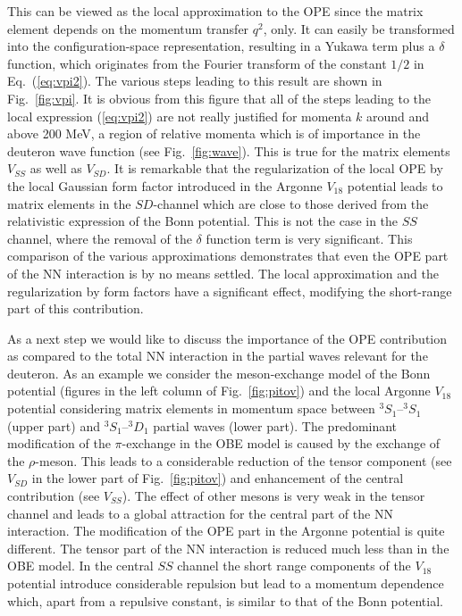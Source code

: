 This can be viewed as the local approximation to 
the OPE since the matrix element
depends on the momentum transfer $q^2$, only. It can easily 
be transformed into
the configuration-space representation, resulting in a 
Yukawa term plus a $\delta$
function, which originates from the Fourier transform of the constant $1/2$ in
Eq.\ (\ref{eq:vpi2}). The various steps leading to 
this result are shown in  
Fig.\ \ref{fig:vpi}. It is obvious from this figure that 
all of the steps leading
to the local expression (\ref{eq:vpi2}) are not really justified 
for momenta $k$
around and above 200 MeV, a region of relative momenta which 
is of importance in
the deuteron wave function (see Fig.\ \ref{fig:wave}).  
This is true for the matrix elements $V_{SS}$ as well as $V_{SD}$. It is
remarkable that the regularization of the local OPE by the local Gaussian
form factor introduced in the Argonne $V_{18}$ 
potential leads to matrix elements in
the $SD$-channel which are close to those derived from the relativistic
expression of the Bonn potential. This is not the case in the $SS$ channel, 
where the removal of the $\delta$ function term is very significant. This
comparison of the various approximations demonstrates that even the OPE part 
of the NN interaction is by no means settled.
The local approximation and the 
regularization by form factors
have a significant effect, modifying the short-range part of this contribution.

As a next step we would like to discuss the importance of the OPE contribution
as compared to the total NN interaction in the partial waves relevant for the
deuteron. As an example we consider the meson-exchange model of the Bonn
potential (figures in the left column of Fig.\ \ref{fig:pitov}) and the local
Argonne $V_{18}$ potential considering matrix 
elements in momentum space between
$^3S_1$--$^3S_1$ (upper part) and $^3S_1$--$^3D_1$ partial waves (lower part). 
The predominant
modification of the $\pi$-exchange in the OBE model is caused by 
the exchange of
the $\rho$-meson. This leads to a considerable reduction of the 
tensor component
(see $V_{SD}$ in the lower part of Fig.\ \ref{fig:pitov}) 
and enhancement of the
central contribution (see $V_{SS}$). 
The effect of other mesons is very weak in
the tensor channel and leads to a global attraction for the central part of the
NN interaction. The modification of the OPE part in the Argonne potential is
quite different. The tensor part of the NN interaction 
is reduced much less than
in the OBE model. In the central $SS$ channel the short range components of the
$V_{18}$ potential introduce considerable repulsion 
but lead to a momentum dependence which, apart
from a repulsive constant, is similar to that of the Bonn potential.

